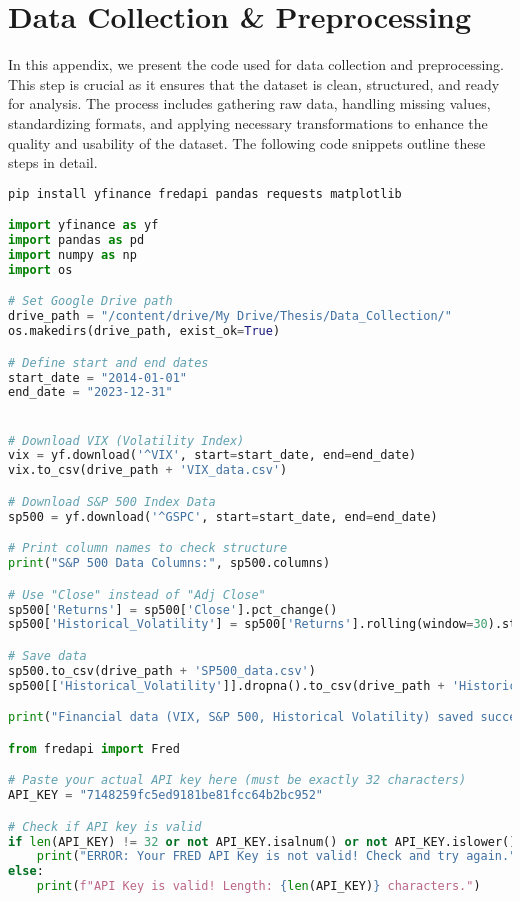 \chapter{Data Collection \& Preprocessing}

In this appendix, we present the code used for data collection and preprocessing. This step is crucial as it ensures that the dataset is clean, structured, and ready for analysis. The process includes gathering raw data, handling missing values, standardizing formats, and applying necessary transformations to enhance the quality and usability of the dataset. The following code snippets outline these steps in detail.

\begin{lstlisting}[language=Python, caption=Data Collection]
pip install yfinance fredapi pandas requests matplotlib

import yfinance as yf
import pandas as pd
import numpy as np
import os

# Set Google Drive path
drive_path = "/content/drive/My Drive/Thesis/Data_Collection/"
os.makedirs(drive_path, exist_ok=True)

# Define start and end dates
start_date = "2014-01-01"
end_date = "2023-12-31"


# Download VIX (Volatility Index)
vix = yf.download('^VIX', start=start_date, end=end_date)
vix.to_csv(drive_path + 'VIX_data.csv')

# Download S&P 500 Index Data
sp500 = yf.download('^GSPC', start=start_date, end=end_date)

# Print column names to check structure
print("S&P 500 Data Columns:", sp500.columns)

# Use "Close" instead of "Adj Close"
sp500['Returns'] = sp500['Close'].pct_change()
sp500['Historical_Volatility'] = sp500['Returns'].rolling(window=30).std() * np.sqrt(252)  # Annualized volatility

# Save data
sp500.to_csv(drive_path + 'SP500_data.csv')
sp500[['Historical_Volatility']].dropna().to_csv(drive_path + 'Historical_Volatility.csv')

print("Financial data (VIX, S&P 500, Historical Volatility) saved successfully in Google Drive!")

from fredapi import Fred

# Paste your actual API key here (must be exactly 32 characters)
API_KEY = "7148259fc5ed9181be81fcc64b2bc952"

# Check if API key is valid
if len(API_KEY) != 32 or not API_KEY.isalnum() or not API_KEY.islower():
    print("ERROR: Your FRED API Key is not valid! Check and try again.")
else:
    print(f"API Key is valid! Length: {len(API_KEY)} characters.")


\end{lstlisting}
